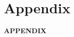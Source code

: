 \documentclass[11pt, a4paper]{article} %
\begin{document}









\newpage
\TODO\section{Appendix}
\vspace*{\fill}
{\Huge \begin{center}\textbf{APPENDIX}\end{center}}
\vspace*{\fill}\clearpage


\renewcommand\thefigure{A.\arabic{figure}}
\setcounter{figure}{0} 
\captionsetup[subfigure]{labelformat=parens}




\end{document}
